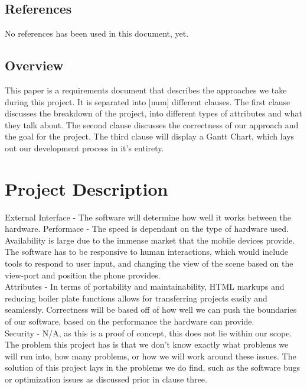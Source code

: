\documentclass[letterpaper,10pt,titlepage,draftclsnofoot,onecolumn,compsoc,utf8,latin1]{IEEEtran}
\begin{document}
\subsection{References}
No references has been used in this document, yet.

\subsection{Overview}
\begin{singlespace}
\noindent
This paper is a requirements document that describes the approaches we take during this project. It is separated into [num] different clauses. The first clause discusses the breakdown of the project, into different types of attributes and what they talk about. The second clause discusses the correctness of our approach and the goal for the project. The third clause will display a Gantt Chart, which lays out our development process in it's entirety.
\end{singlespace}

\section{Project Description}
\begin{singlespace}
\noindent
External Interface - The software will determine how well it works between the hardware.
\noindent
Performace - The speed is dependant on the type of hardware used.
Availability is large due to the immense market that the mobile devices provide. The software has to be responsive to human interactions, which would include tools to respond to user input, and changing the view of the scene based on the view-port and position the phone provides.\\

\noindent
Attributes - In terms of portability and maintainability, HTML markups and reducing boiler plate functions allows for transferring projects easily and seamlessly.
Correctness will be based off of how well we can push the boundaries of our software, based on the performance the hardware can provide.\\

\noindent
Security - N/A, as this is a proof of concept, this does not lie within our scope.\\
\noindent
The problem this project has is that we don't know exactly what problems we will run into, how many problems, or how we will work around these issues. The solution of this project lays in the problems we do find, such as the software bugs or optimization issues as discussed prior in clause three.
\end{singlespace}
\end{document}
